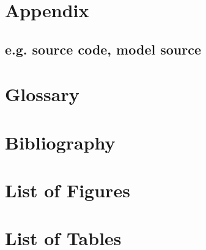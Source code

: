 \documentclass[a4paper, 10pt]{article}
\begin{document}
\appendix

\pagebreak
\section{Appendix}
\subsection{e.g. source code, model source}

\pagebreak
\section{Glossary}

\pagebreak
\section{Bibliography}
\renewcommand\refname{\vskip -1cm} %
\nocite{*} %

{}

\pagebreak
\section{List of Figures}
\renewcommand{\listfigurename}{\vskip -1cm} %
\listoffigures

\pagebreak
\section{List of Tables}
\renewcommand{\listtablename}{\vskip -1cm} %
\listoftables
\end{document}
